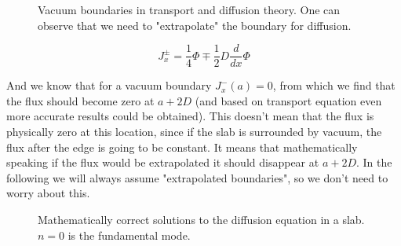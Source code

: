 \begin{figure}[ht!]
\protect {}\protect
\caption{\label{fig:boundary} \footnotesize{Vacuum boundaries in transport and diffusion theory. One can observe that we need to "extrapolate" the boundary for diffusion.}}
\end{figure} 


\[
J_x^\pm=\frac{1}{4}\Phi\mp\frac{1}{2}D\frac{d}{dx}\Phi
\]

And we know that for a vacuum boundary $J_x^-(a)=0$, from which we find that the flux should become zero at $a+2D$ (and based on transport equation even more accurate results could be obtained). This doesn't mean that the flux is physically zero at this location, since if the slab is surrounded by vacuum, the flux after the edge is going to be constant. It means that mathematically speaking if the flux would be extrapolated it should disappear at $a+2D$. In the following we will always assume "extrapolated boundaries", so we don't need to worry about this.

\begin{figure}[ht!]
\protect {}\protect
\caption{\label{fig:multislab} \footnotesize{Mathematically correct solutions to the diffusion equation in a slab. $n=0$ is the fundamental mode.}}
\end{figure} 

